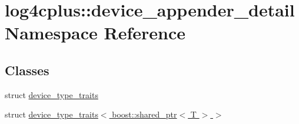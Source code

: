 \hypertarget{namespacelog4cplus_1_1device__appender__detail}{\section{log4cplus\-:\-:device\-\_\-appender\-\_\-detail Namespace Reference}
\label{namespacelog4cplus_1_1device__appender__detail}
}
\subsection*{Classes}
\begin{DoxyCompactItemize}
\item 
struct \hyperlink{structlog4cplus_1_1device__appender__detail_1_1device__type__traits}{device\-\_\-type\-\_\-traits}
\item 
struct \hyperlink{structlog4cplus_1_1device__appender__detail_1_1device__type__traits_3_01boost_1_1shared__ptr_3_01T_01_4_01_4}{device\-\_\-type\-\_\-traits$<$ boost\-::shared\-\_\-ptr$<$ T $>$ $>$}
\end{DoxyCompactItemize}
